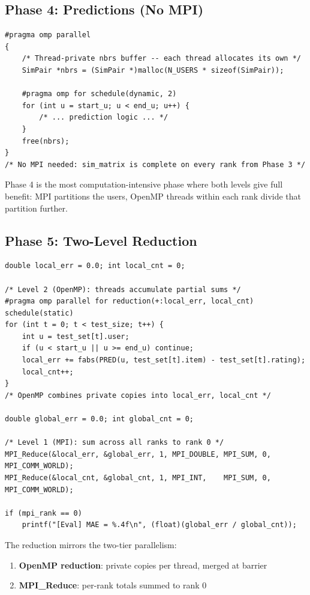 \documentclass[12pt,a4paper]{article}
\begin{document}
\subsection{Phase 4: Predictions (No MPI)}

\begin{lstlisting}
#pragma omp parallel
{
    /* Thread-private nbrs buffer -- each thread allocates its own */
    SimPair *nbrs = (SimPair *)malloc(N_USERS * sizeof(SimPair));

    #pragma omp for schedule(dynamic, 2)
    for (int u = start_u; u < end_u; u++) {
        /* ... prediction logic ... */
    }
    free(nbrs);
}
/* No MPI needed: sim_matrix is complete on every rank from Phase 3 */
\end{lstlisting}

Phase 4 is the most computation-intensive phase where both levels give full
benefit: MPI partitions the users, OpenMP threads within each rank divide
that partition further.

\subsection{Phase 5: Two-Level Reduction}

\begin{lstlisting}
double local_err = 0.0; int local_cnt = 0;

/* Level 2 (OpenMP): threads accumulate partial sums */
#pragma omp parallel for reduction(+:local_err, local_cnt) schedule(static)
for (int t = 0; t < test_size; t++) {
    int u = test_set[t].user;
    if (u < start_u || u >= end_u) continue;
    local_err += fabs(PRED(u, test_set[t].item) - test_set[t].rating);
    local_cnt++;
}
/* OpenMP combines private copies into local_err, local_cnt */

double global_err = 0.0; int global_cnt = 0;

/* Level 1 (MPI): sum across all ranks to rank 0 */
MPI_Reduce(&local_err, &global_err, 1, MPI_DOUBLE, MPI_SUM, 0, MPI_COMM_WORLD);
MPI_Reduce(&local_cnt, &global_cnt, 1, MPI_INT,    MPI_SUM, 0, MPI_COMM_WORLD);

if (mpi_rank == 0)
    printf("[Eval] MAE = %.4f\n", (float)(global_err / global_cnt));
\end{lstlisting}

The reduction mirrors the two-tier parallelism:
\begin{enumerate}
    \item \textbf{OpenMP reduction}: private copies per thread, merged at barrier
    \item \textbf{MPI\_Reduce}: per-rank totals summed to rank 0
\end{enumerate}
\end{document}
